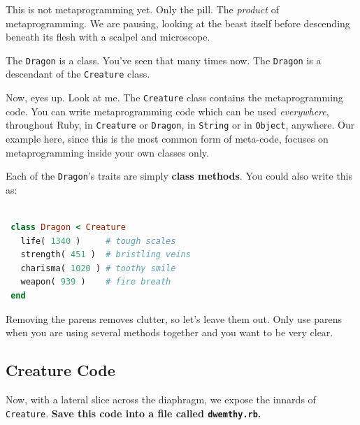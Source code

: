 \documentclass[10pt,twoside]{report}
\begin{document}
This is not metaprogramming yet.  Only the pill.  The {\em product} of
metaprogramming.  We are pausing, looking at the beast itself before
descending beneath its flesh with a scalpel and microscope.

The \lstinline[breaklines=true]|Dragon| is a class.  You've seen that
many times now.  The \lstinline[breaklines=true]|Dragon| is a
descendant of the \lstinline[breaklines=true]|Creature| class.

Now, eyes up.  Look at me.  The \lstinline[breaklines=true]|Creature|
class contains the metaprogramming code.  You can write
metaprogramming code which can be used {\em everywhere}, throughout
Ruby, in \lstinline[breaklines=true]|Creature| or
\lstinline[breaklines=true]|Dragon|, in
\lstinline[breaklines=true]|String| or in
\lstinline[breaklines=true]|Object|, anywhere. Our example here, since
this is the most common form of meta-code, focuses on metaprogramming
inside your own classes only.

Each of the \lstinline[breaklines=true]|Dragon|'s traits are simply
{\bf class methods}.  You could also write this as:


\begin{lstlisting}[basicstyle=\ttfamily\color{basiccolor},
    commentstyle = \ttfamily\color{commentcolor},
    keywordstyle=\ttfamily\color{keywordscolor},
    stringstyle=\color{stringcolor},
    language=Ruby,
    basicstyle=\small\ttfamily,
    showstringspaces=false,
  ]

 class Dragon < Creature
   life( 1340 )     # tough scales
   strength( 451 )  # bristling veins
   charisma( 1020 ) # toothy smile
   weapon( 939 )    # fire breath
 end

\end{lstlisting}


Removing the parens removes clutter, so let's leave them out.  Only
use parens when you are using several methods together and you want to
be very clear.



\subsection{Creature Code}



Now, with a lateral slice across the diaphragm, we expose the innards
of \lstinline[breaklines=true]|Creature|.  {\bf Save this code into a
  file called \lstinline[breaklines=true]|dwemthy.rb|.}
\end{document}
